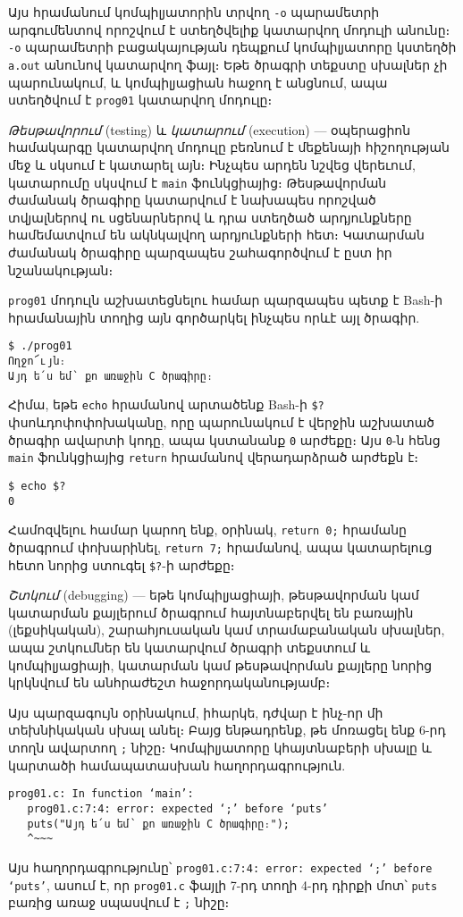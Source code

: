 Այս հրամանում կոմպիլյատորին տրվող \verb|-o| պարամետրի արգումենտով որոշվում է ստեղծվելիք կատարվող մոդուլի անունը։ \verb|-o| պարամետրի բացակայության դեպքում կոմպիլյատորը կստեղծի \verb|a.out| անունով կատարվող ֆայլ։ Եթե ծրագրի տեքստը սխալներ չի պարունակում, և կոմպիլյացիան հաջող է անցնում, ապա ստեղծվում է \verb|prog01| կատարվող մոդուլը։

\emph{Թեսթավորում} (testing) և \emph{կատարում} (execution) --- օպերացիոն համակարգը կատարվող մոդուլը բեռնում է մեքենայի հիշողության մեջ և սկսում է կատարել այն։ Ինչպես արդեն նշվեց վերեւում, կատարումը սկսվում է \texttt{main} ֆունկցիայից։ Թեսթավորման ժամանակ ծրագիրը կատարվում է նախապես որոշված տվյալներով ու սցենարներով և դրա ստեղծած արդյունքները համեմատվում են ակնկալվող արդյունքների հետ։ Կատարման ժամանակ ծրագիրը պարզապես շահագործվում է ըստ իր նշանակության։

\texttt{prog01} մոդուլն աշխատեցնելու համար պարզապես պետք է Bash-ի հրամանային տողից այն գործարկել ինչպես որևէ այլ ծրագիր.

\begin{verbatim}
$ ./prog01
Ողջո՜ւյն։
Այդ ե՛ս եմ՝ քո առաջին C ծրագիրը։
\end{verbatim}

Հիմա, եթե \texttt{echo} հրամանով արտածենք Bash-ի \verb|$?| փսոևդոփոփոխականը, որը պարունակում է վերջին աշխատած ծրագիր ավարտի կոդը, ապա կստանանք \texttt{0} արժեքը։ Այս \texttt{0}-ն հենց \texttt{main} ֆունկցիայից \texttt{return} հրամանով վերադարձրած արժեքն է։

\begin{verbatim}
$ echo $?
0
\end{verbatim}

Համոզվելու համար կարող ենք, օրինակ, \texttt{return 0;} հրամանը ծրագրում փոխարինել, \texttt{return 7;} հրամանով, ապա կատարելուց հետո նորից ստուգել \verb|$?|-ի արժեքը։

\emph{Շտկում} (debugging) --- եթե կոմպիլյացիայի, թեսթավորման կամ կատարման քայլերում ծրագրում հայտնաբերվել են բառային (լեքսիկական), շարահյուսական կամ տրամաբանական սխալներ,  ապա շտկումներ են կատարվում ծրագրի տեքստում և կոմպիլյացիայի, կատարման կամ թեսթավորման քայլերը նորից կրկնվում են անհրաժեշտ հաջորդականությամբ։

Այս պարզագույն օրինակում, իհարկե, դժվար է ինչ-որ մի տեխնիկական սխալ անել։ Բայց ենթադրենք, թե մոռացել ենք 6-րդ տողն ավարտող \verb|;| նիշը։ Կոմպիլյատորը կհայտնաբերի սխալը և կարտածի համապատասխան հաղորդագրություն.

\begin{verbatim}
prog01.c: In function ‘main’:
   prog01.c:7:4: error: expected ‘;’ before ‘puts’
   puts("Այդ ե՛ս եմ՝ քո առաջին C ծրագիրը։");
   ^~~~
\end{verbatim}

Այս հաղորդագրությունը՝ \texttt{prog01.c:7:4: error: expected ‘;’ before ‘puts’}, ասում է, որ \texttt{prog01.c} ֆայլի 7-րդ տողի 4-րդ դիրքի մոտ՝ \texttt{puts} բառից առաջ սպասվում է \verb|;| նիշը։
